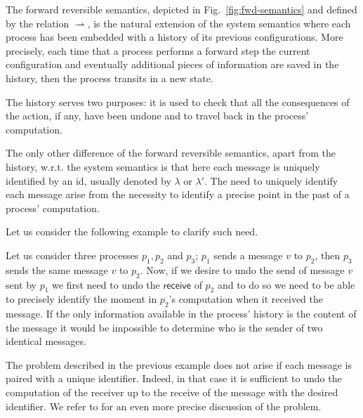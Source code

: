 \documentclass[runningheads]{llncs}
\newcommand{\ms}[1]{\mathsf{#1}}
\newcommand{\rh}{\rightharpoonup}
\begin{document}
The forward reversible semantics, depicted in Fig.~\ref{fig:fwd-semantics} and
defined by the relation $\rh$,
is the natural extension of the system semantics where each process has been
embedded with a history of its previous configurations. More precisely, each time that a process performs a
forward step the current configuration and eventually additional pieces of
information are saved in the history, then the process transits in
a new state.

The history serves two purposes: it is used to check that all the consequences
of the action, if any, have been undone and to travel back in the process' computation.

The only other difference of the forward reversible semantics, apart from the
history, w.r.t. the system semantics is that here each message is uniquely identified
by an id, usually denoted by $\lambda$ or $\lambda'$. The need to uniquely
identify each message arise from the necessity to identify a precise point in
the past of a process' computation.

Let us consider the following example to clarify such need.

\begin{example}
   Let us consider three processes $p_1,p_2$ and $p_3$; $p_1$ sends a
   message $v$ to  $p_2$, then $p_3$ sends the same message $v$ to $p_2$. Now,
   if we desire to undo the send of message $v$ sent by $p_1$ we first need to
   undo the $\ms{receive}$ of $p_2$ and to do so we need to be able to precisely identify the moment in $p_2$'s computation when it received the message. If the only information available in the process' history is the content of the message it would be impossible to determine who is the sender of two identical messages. 
 \end{example}

The problem described in the previous example does not arise if each message is
paired with a unique identifier. Indeed, in that case it is sufficient to undo
the computation of the receiver up to the receive of the message with the
desired identifier. We refer to \cite{LaneseNPV18} for an even more precise discussion
of the problem.
\end{document}
